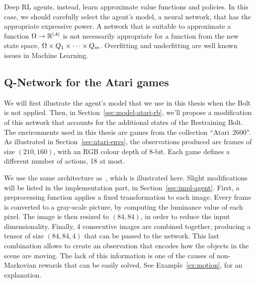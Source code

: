 Deep RL agents, instead, learn approximate value functions and policies. In
this case, we should carefully select the agent's model, a neural network,
that has the appropriate expressive power. A network that is suitable to
approximate a function $\Omega \to \mathbb{R}^{\lvert A\rvert}$ is not necessarily appropriate
for a function from the new state space, $\Omega \times Q_1 \times \dots \times
Q_m$. Overfitting and underfitting are well known issues in Machine Learning.


\subsection{Q-Network for the Atari games}

\label{sec:model-atari}

We will first illustrate the agent's model that we use in this thesis when the
Bolt is not applied. Then, in Section~\ref{sec:model-atari-rb}, we'll propose
a modification of this network that accounts for the additional states of the
Restraining Bolt.  The environments used in this thesis are games from the
collection ``Atari~2600''.  As illustrated in Section~\ref{sec:atari-envs},
the observations produced are frames of size $(210, 160)$, with an RGB colour
depth of 8-bit. Each game defines a different number of actions, 18 at most.

We use the same architecture as~\cite{bib:atari-deepq-nature}, which is
illustrated here. Slight modifications will be listed in the implementation
part, in Section~\ref{sec:impl-agent}. First, a preprocessing function applies
a fixed transformation to each image. Every frame is converted to a gray-scale
picture, by computing the luminance value of each pixel. The image is then
resized to $(84, 84)$, in order to reduce the input dimensionality. Finally, 4
consecutive images are combined together, producing a tensor of size $(84, 84,
4)$ that can be passed to the network. This last combination allows to create
an observation that encodes how the objects in the scene are moving. The lack
of this information is one of the causes of non-Markovian rewards that can be
easily solved. See Example~\ref{ex:motion}, for an explanation.

